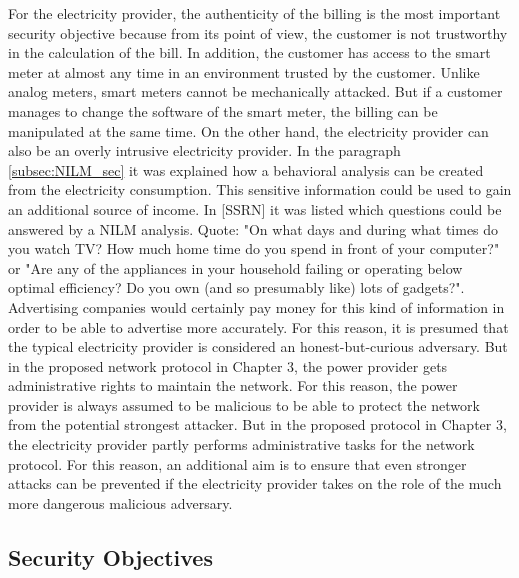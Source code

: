 For the electricity provider, the authenticity of the billing is the most important security objective because from its point of view, the customer is not trustworthy in the calculation of the bill. In addition, the customer has access to the smart meter at almost any time in an environment trusted by the customer. Unlike analog meters, smart meters cannot be mechanically attacked. But if a customer manages to change the software of the smart meter, the billing can be manipulated at the same time. On the other hand, the electricity provider can also be an overly intrusive electricity provider. In the paragraph \ref{subsec:NILM_sec} it was explained how a behavioral analysis can be created from the electricity consumption. This sensitive information could be used to gain an additional source of income. In [SSRN] it was listed which questions could be answered by a NILM analysis. Quote: "On what days and during what times do you watch TV? How much home time do you spend in front of your computer?" or "Are any of the appliances in your household failing or operating below optimal efficiency? Do you own (and so presumably like) lots of gadgets?". Advertising companies would certainly pay money for this kind of information in order to be able to advertise more accurately. For this reason, it is presumed that the typical electricity provider is considered an honest-but-curious adversary. But in the proposed network protocol in Chapter 3, the power provider gets administrative rights to maintain the network. For this reason, the power provider is always assumed to be malicious to be able to protect the network from the potential strongest attacker. But in the proposed protocol in Chapter 3, the electricity provider partly performs administrative tasks for the network protocol. For this reason, an additional aim is to ensure that even stronger attacks can be prevented if the electricity provider takes on the role of the much more dangerous malicious adversary.

\subsection{Security Objectives}

